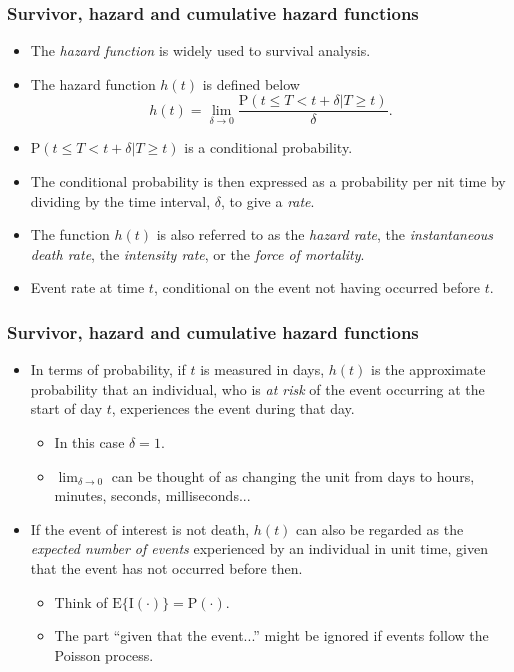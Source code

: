 \documentclass[10pt]{beamer}\usepackage[]{graphicx}\usepackage[]{color}
\newcommand{\empr}[1]{{\emph{\color{red}#1}}}
\newcommand{\E}{\mathrm{E}}
\newcommand{\I}{\mathrm{I}}
\newcommand{\p}{\mathrm{P}}
\begin{document}
\begin{frame}
  \frametitle{Survivor, hazard and cumulative hazard functions}
  \begin{itemize}
    \item The \empr{hazard function} is widely used to survival analysis. 
    \item The hazard function $h(t)$ is defined below
      \begin{equation}
        h(t) = \lim_{\delta\to0}\frac{\p(t\le T < t + \delta|T\ge t)}{\delta}.
        \label{eq:haz}
      \end{equation}
    \item $\p(t\le T< t + \delta|T\ge t)$ is a conditional probability.
    \item The conditional probability is then expressed as a probability per nit time by dividing by the time interval, $\delta$, to give a \emph{rate}.
    \item The function $h(t)$ is also referred to as the \empr{hazard rate}, the \empr{instantaneous death rate}, 
      the \empr{intensity rate}, or the \empr{force of mortality}.
    \item Event rate at time $t$, conditional on the event not having occurred before $t$.
    \end{itemize}
\end{frame}

\begin{frame}
  \frametitle{Survivor, hazard and cumulative hazard functions}
  \begin{itemize}
    \item In terms of probability, if $t$ is measured in days, $h(t)$ is the approximate probability that an individual, 
      who is \emph{at risk} of the event occurring at the start of day $t$, experiences the event during that day.
      \begin{itemize}
      \item In this case $\delta = 1$.
      \item $\lim_{\delta \to0}$ can be thought of as changing the unit from days to hours, minutes, seconds, milliseconds...
      \end{itemize}
    \item If the event of interest is not death, $h(t)$ can also be regarded as the \emph{expected number of events}
      experienced by an individual in unit time, given that the event has not occurred before then. 
      \begin{itemize}
        \item Think of $\E\{\I(\cdot)\} = \p(\cdot)$.
        \item The part ``given that the event...'' might be ignored if events follow the Poisson process.
        \end{itemize}
      \end{itemize}
\end{frame}
\end{document}
